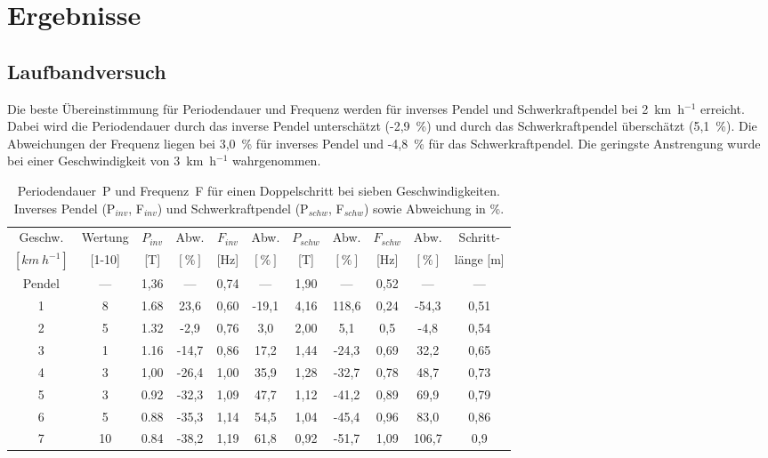 \section{Ergebnisse}
\subsection{Laufbandversuch}
Die beste Übereinstimmung für Periodendauer und Frequenz werden für inverses Pendel und Schwerkraftpendel bei 2~km~h$^{-1}$ erreicht. Dabei wird die Periodendauer durch das inverse Pendel unterschätzt (-2,9~\%) und durch das Schwerkraftpendel überschätzt (5,1~\%). Die Abweichungen der Frequenz liegen bei 3,0~\% für inverses Pendel und -4,8~\% für das Schwerkraftpendel. Die geringste Anstrengung wurde bei einer Geschwindigkeit von 3~km~h$^{-1}$ wahrgenommen.

\begin{table}[h!]
\centering
\caption[Ergebnisse Laufbandversuch]{Periodendauer~P und Frequenz~F für einen Doppelschritt bei sieben Geschwindigkeiten. Inverses Pendel (P$_{inv}$, F$_{inv}$) und Schwerkraftpendel (P$_{schw}$, F$_{schw}$) sowie Abweichung in \%.}
\label{tab:Erg_Pend}
\begin{tabular}{c c c c c c c c c c c}
\toprule
Geschw. & Wertung & $P_{inv}$ & Abw. & $F_{inv}$ & Abw. & $P_{schw}$ & Abw. & $F_{schw}$ & Abw. & Schritt-\\
$[km~h^{-1}]$  & [1-10] & [T] & $[\%]$ & [Hz] & $[\%]$ &  [T] & $[\%]$ & [Hz] & $[\%]$ & länge [m]\\
\midrule
Pendel	&---& 1,36 	& ---	& 0,74 	& ---	& 1,90	&---	& 0,52&	---		& ---	\\
1 		& 8	& 1.68 	& 23,6	& 0,60 	&  -19,1& 4,16	& 118,6	& 0,24&	-54,3	& 0,51	\\
2 		& 5 & 1.32 	& -2,9	& 0,76 	&  3,0	& 2,00	& 5,1 	& 0,5 &	-4,8	& 0,54	\\
3 		& 1 & 1.16 	& -14,7	& 0,86 	& 17,2	& 1,44	& -24,3	& 0,69&	32,2	& 0,65	\\
4 		& 3 & 1,00	& -26,4	& 1,00 	& 35,9	& 1,28	& -32,7	& 0,78&	48,7	& 0,73	\\
5 		& 3 & 0.92 	& -32,3	& 1,09 	& 47,7	& 1,12	& -41,2	& 0,89&	69,9	& 0,79	\\
6 		& 5 & 0.88 	& -35,3	& 1,14 	& 54,5	& 1,04	& -45,4	& 0,96&	83,0	& 0,86	\\
7 		& 10& 0.84 	& -38,2	& 1,19 	& 61,8	& 0,92	& -51,7	& 1,09&	106,7	& 0,9	\\
\bottomrule
\end{tabular}
\end{table}

